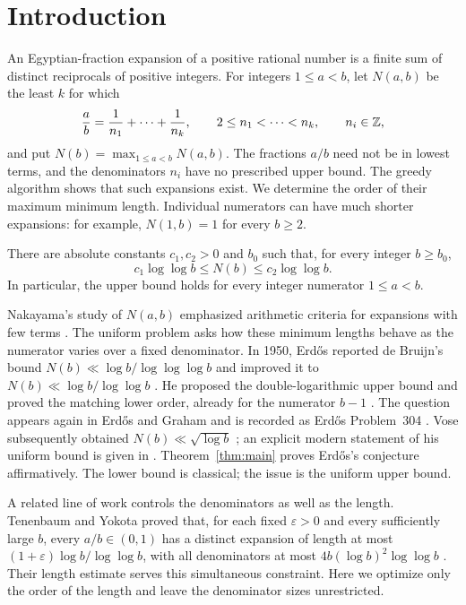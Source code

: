 \section{Introduction}\label{sec:introduction}

An Egyptian-fraction expansion of a positive rational number is a finite
sum of distinct reciprocals of positive integers. For integers
$1\le a<b$, let $N(a,b)$ be the least $k$ for which
\[
 \frac ab=\frac1{n_1}+\cdots+\frac1{n_k},
 \qquad 2\le n_1<\cdots<n_k,\qquad n_i\in\mathbb Z,
\]
and put $N(b)=\max_{1\le a<b}N(a,b)$. The fractions $a/b$ need not be
in lowest terms, and the denominators $n_i$ have no prescribed upper bound.
The greedy algorithm shows that such expansions exist. We determine
the order of their maximum minimum length. Individual numerators can
have much shorter expansions: for example, $N(1,b)=1$ for every $b\ge2$.

\begin{theorem}\label{thm:main}
There are absolute constants $c_1,c_2>0$ and $b_0$ such that, for every
integer $b\ge b_0$,
\[
 c_1\log\log b\le N(b)\le c_2\log\log b.
\]
In particular, the upper bound holds for every integer numerator
$1\le a<b$.
\end{theorem}

Nakayama's study of $N(a,b)$ emphasized arithmetic criteria for
expansions with few terms \cite[Section~I]{Nakayama1940}.
The uniform problem asks how these minimum lengths behave as the
numerator varies over a fixed denominator. In 1950, Erd\H{o}s
reported de Bruijn's bound $N(b)\ll\log b/\log\log\log b$ and
improved it to $N(b)\ll\log b/\log\log b$
\cite[p.~195, Theorem~1]{Erdos1950}.
He proposed the double-logarithmic upper bound and proved the matching
lower order, already for the numerator $b-1$
\cite[p.~195, Theorem~2]{Erdos1950}.
The question appears again in Erd\H{o}s and Graham
\cite[pp.~37--38]{ErdosGraham1980} and is recorded as Erd\H{o}s
Problem~304 \cite{Bloom304}.
Vose subsequently obtained $N(b)\ll\sqrt{\log b}$ \cite{Vose1985};
an explicit modern statement of his uniform bound is given in
\cite[Lemma~2.2]{vanDoornTang2026}.
Theorem~\ref{thm:main} proves Erd\H{o}s's conjecture affirmatively.
The lower bound is classical; the issue is the uniform upper bound.

A related line of work controls the denominators as well as the
length. Tenenbaum and Yokota proved that, for each fixed
$\varepsilon>0$ and every sufficiently large $b$, every $a/b\in(0,1)$
has a distinct expansion of length at most
$(1+\varepsilon)\log b/\log\log b$, with all denominators at most
$4b(\log b)^2\log\log b$ \cite[Theorem, p.~151]{TenenbaumYokota1990}.
Their length estimate serves this simultaneous constraint.
Here we optimize only the order of the length and leave the
denominator sizes unrestricted.

